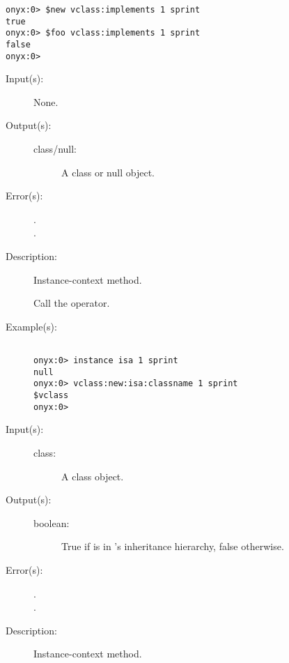 \begin{description}
\begin{description}
\begin{verbatim}
onyx:0> $new vclass:implements 1 sprint
true
onyx:0> $foo vclass:implements 1 sprint
false
onyx:0>
		\end{verbatim}
	\end{description}
\label{vclass:isa}
\item[{\onyxop{--}{isa}{class}}: ]
	\begin{description}\item[]
	\item[Input(s): ] None.
	\item[Output(s): ]
		\begin{description}\item[]
		\item[class/null: ]
			A class or null object.
		\end{description}
	\item[Error(s): ]
		\begin{description}\item[]
		\item[.]
		\item[.]
		\end{description}
	\item[Description: ]
		Instance-context method.

		Call the  operator.
	\item[Example(s): ]\begin{verbatim}

onyx:0> instance isa 1 sprint
null
onyx:0> vclass:new:isa:classname 1 sprint
$vclass
onyx:0>
		\end{verbatim}
	\end{description}
\label{vclass:kind}
\item[{\onyxop{class}{kind}{boolean}}: ]
	\begin{description}\item[]
	\item[Input(s): ]
		\begin{description}\item[]
		\item[class: ]
			A class object.
		\end{description}
	\item[Output(s): ]
		\begin{description}\item[]
		\item[boolean: ]
			True if  is in 's
			inheritance hierarchy, false otherwise.
		\end{description}
	\item[Error(s): ]
		\begin{description}\item[]
		\item[.]
		\item[.]
		\end{description}
	\item[Description: ]
		Instance-context method.


\end{description}
\end{description}
